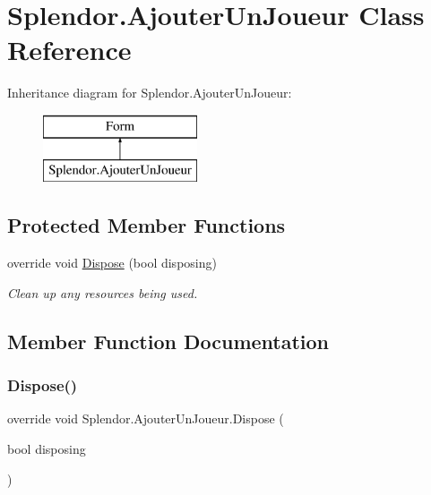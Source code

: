 \hypertarget{class_splendor_1_1_ajouter_un_joueur}{}\section{Splendor.\+Ajouter\+Un\+Joueur Class Reference}
\label{class_splendor_1_1_ajouter_un_joueur}
Inheritance diagram for Splendor.\+Ajouter\+Un\+Joueur\+:\begin{figure}[H]
\begin{center}
\leavevmode
\includegraphics[height=2.000000cm]{class_splendor_1_1_ajouter_un_joueur}
\end{center}
\end{figure}
\subsection*{Protected Member Functions}
\begin{DoxyCompactItemize}
\item 
override void \hyperlink{class_splendor_1_1_ajouter_un_joueur_aa617f5fe410b36abce0fe53b820f3c44}{Dispose} (bool disposing)
\begin{DoxyCompactList}\small\item\em Clean up any resources being used. \end{DoxyCompactList}\end{DoxyCompactItemize}


\subsection{Member Function Documentation}
\mbox{\label{class_splendor_1_1_ajouter_un_joueur_aa617f5fe410b36abce0fe53b820f3c44}} 
\subsubsection{\texorpdfstring{Dispose()}{Dispose()}}
{\footnotesize\ttfamily override void Splendor.\+Ajouter\+Un\+Joueur.\+Dispose (\begin{DoxyParamCaption}\item[{bool}]{disposing }\end{DoxyParamCaption})\hspace{0.3cm}{\ttfamily [protected]}}



